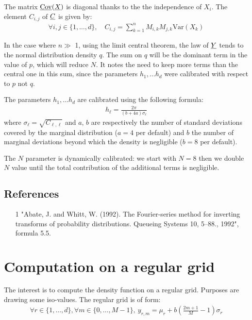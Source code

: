 The matrix ${\underline{\mathrm{Cov}}}({\underline{X}})$ is diagonal thanks to the the independence of $X_i$.
The element $C_{i,j}$ of ${\underline{C}}$ is given by:
\begin{align}
\forall i,j\in\{1,\hdots,d\},\quad C_{i,j}=\sum_{k=1}^nM_{i,k}M_{j,k}\mathrm{Var}(X_k)
\end{align}

In the case where $n \gg $ 1, using the limit central theorem, the law of ${\underline{Y}} $ tends to the normal distribution density $q$.
The sum on $q$ will be the dominant term in the value of $p$, which will reduce $N$.
It notes the need to keep more terms than the central one in this sum, since the parameters $ h_1, \dots  h_d$ were calibrated
with respect to $p$ not $q$.

The parameters $h_1, \dots  h_d$ are calibrated using the following formula:
\begin{align}
  h_\ell = \frac{2\pi}{(b+4a)\sigma_\ell}
\end{align}
where $\sigma_\ell=\sqrt{C_{\ell,\ell}}$ and $a$, $b$ are respectively the number of standard deviations covered by the marginal distribution
($a=4$ per default) and $b$ the number of marginal deviations beyond which the density is negligible ($b=8$ per default).

The $N$ parameter is dynamically calibrated: we start with $N=8$ then we double $N$ value until the total contribution of the additional terms is negligible.

\subsection{References}\label{ref}
\begin{itemize}
  \item[1] "Abate, J. and Whitt, W. (1992). The Fourier-series method for inverting transforms of probability distributions. Queueing Systems 10, 5--88., 1992",
        formula 5.5.
\end{itemize}

\section{Computation on a regular grid}

The interest is to compute the density function on a regular grid. Purposes are drawing some iso-values.
The regular grid is of form:
\begin{align}
  \forall r\in\{1,\hdots,d\},\forall m\in\{0,\hdots,M-1\},\:y_{r,m}=\mu_r+b\left(\frac{2m+1}{M} - 1\right)\sigma_r
\end{align}

